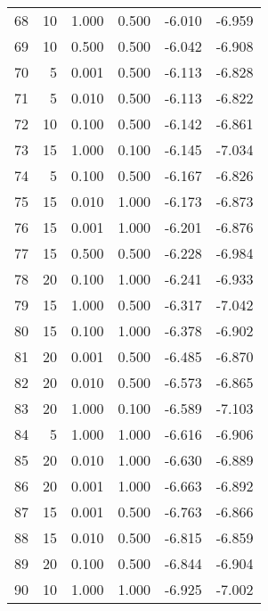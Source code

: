 \begin{tabular}{rrrrrr}
    68 &        10 &  1.000 & 0.500 &                 -6.010 &      -6.959 \\
    69 &        10 &  0.500 & 0.500 &                 -6.042 &      -6.908 \\
    70 &         5 &  0.001 & 0.500 &                 -6.113 &      -6.828 \\
    71 &         5 &  0.010 & 0.500 &                 -6.113 &      -6.822 \\
    72 &        10 &  0.100 & 0.500 &                 -6.142 &      -6.861 \\
    73 &        15 &  1.000 & 0.100 &                 -6.145 &      -7.034 \\
    74 &         5 &  0.100 & 0.500 &                 -6.167 &      -6.826 \\
    75 &        15 &  0.010 & 1.000 &                 -6.173 &      -6.873 \\
    76 &        15 &  0.001 & 1.000 &                 -6.201 &      -6.876 \\
    77 &        15 &  0.500 & 0.500 &                 -6.228 &      -6.984 \\
    78 &        20 &  0.100 & 1.000 &                 -6.241 &      -6.933 \\
    79 &        15 &  1.000 & 0.500 &                 -6.317 &      -7.042 \\
    80 &        15 &  0.100 & 1.000 &                 -6.378 &      -6.902 \\
    81 &        20 &  0.001 & 0.500 &                 -6.485 &      -6.870 \\
    82 &        20 &  0.010 & 0.500 &                 -6.573 &      -6.865 \\
    83 &        20 &  1.000 & 0.100 &                 -6.589 &      -7.103 \\
    84 &         5 &  1.000 & 1.000 &                 -6.616 &      -6.906 \\
    85 &        20 &  0.010 & 1.000 &                 -6.630 &      -6.889 \\
    86 &        20 &  0.001 & 1.000 &                 -6.663 &      -6.892 \\
    87 &        15 &  0.001 & 0.500 &                 -6.763 &      -6.866 \\
    88 &        15 &  0.010 & 0.500 &                 -6.815 &      -6.859 \\
    89 &        20 &  0.100 & 0.500 &                 -6.844 &      -6.904 \\
    90 &        10 &  1.000 & 1.000 &                 -6.925 &      -7.002 \\

\end{tabular}
